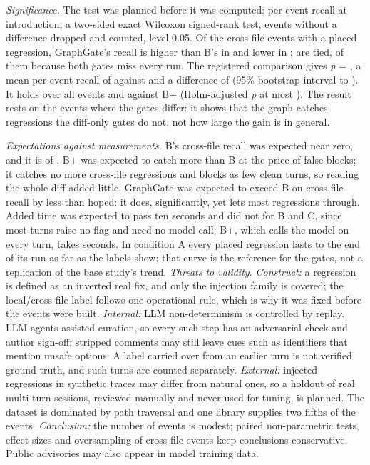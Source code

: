 \documentclass[conference]{IEEEtran}
\begin{document}
\textit{Significance.} The test was planned before it was computed: per-event recall at introduction, a two-sided exact Wilcoxon signed-rank test, events without a difference dropped and counted, level 0.05. Of the \nSigEvents{} cross-file events with a placed regression, GraphGate's recall is higher than B's in \nSigCBetter{} and lower in \nSigBBetter{}; \nSigTies{} are tied, \nSigBothZero{} of them because both gates miss every run. The registered comparison gives \emph{p} = \nSigP{}, a mean per-event recall of \nSigMeanC{} against \nSigMeanB{} and a difference of \nSigDiff{} (95\% bootstrap interval \nSigLow{} to \nSigHigh{}). It holds over all events and against B+ (Holm-adjusted \emph{p} at most \nSigHolm{}). The result rests on the \nSigDiffer{} events where the gates differ: it shows that the graph catches regressions the diff-only gates do not, not how large the gain is in general.

\textit{Expectations against measurements.} B's cross-file recall was expected near zero, and it is \nBCross{} of \nIntroCross{}. B+ was expected to catch more than B at the price of false blocks; it catches no more cross-file regressions and blocks as few clean turns, so reading the whole diff added little. GraphGate was expected to exceed B on cross-file recall by less than hoped: it does, significantly, yet lets most regressions through. Added time was expected to pass ten seconds and did not for B and C, since most turns raise no flag and need no model call; B+, which calls the model on every turn, takes \nBPlusSeconds{} seconds. In condition A every placed regression lasts to the end of its run as far as the labels show; that curve is the reference for the gates, not a replication of the base study's trend.
\textit{Threats to validity.} \emph{Construct:} a regression is defined as an inverted real fix, and only the injection family is covered; the local/cross-file label follows one operational rule, which is why it was fixed before the events were built. \emph{Internal:} LLM non-determinism is controlled by replay. LLM agents assisted curation, so every such step has an adversarial check and author sign-off; stripped comments may still leave cues such as identifiers that mention unsafe options. A label carried over from an earlier turn is not verified ground truth, and such turns are counted separately. \emph{External:} injected regressions in synthetic traces may differ from natural ones, so a holdout of real multi-turn sessions, reviewed manually and never used for tuning, is planned. The dataset is dominated by path traversal and one library supplies two fifths of the events. \emph{Conclusion:} the number of events is modest; paired non-parametric tests, effect sizes and oversampling of cross-file events keep conclusions conservative. Public advisories may also appear in model training data.
\end{document}
